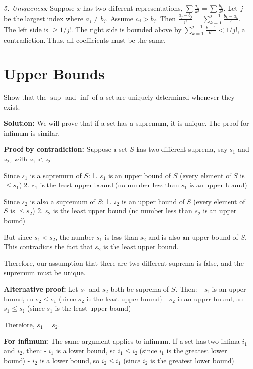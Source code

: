 \textit{5. Uniqueness:} Suppose $x$ has two different representations, $\sum \frac{a_k}{k!} = \sum \frac{b_k}{k!}$. Let $j$ be the largest index where $a_j \neq b_j$. Assume $a_j > b_j$. Then $\frac{a_j - b_j}{j!} = \sum_{k=1}^{j-1} \frac{b_k - a_k}{k!}$. The left side is $\ge 1/j!$. The right side is bounded above by $\sum_{k=1}^{j-1} \frac{k-1}{k!} < 1/j!$, a contradiction. Thus, all coefficients must be the same.


\section{Upper Bounds}

\begin{problembox}
Show that the $\sup$ and $\inf$ of a set are uniquely determined whenever they exist.
\end{problembox}

\textbf{Solution:}
We will prove that if a set has a supremum, it is unique. The proof for infimum is similar.

\textbf{Proof by contradiction:}
Suppose a set $S$ has two different suprema, say $s_1$ and $s_2$, with $s_1 < s_2$.

Since $s_1$ is a supremum of $S$:
1. $s_1$ is an upper bound of $S$ (every element of $S$ is $\leq s_1$)
2. $s_1$ is the least upper bound (no number less than $s_1$ is an upper bound)

Since $s_2$ is also a supremum of $S$:
1. $s_2$ is an upper bound of $S$ (every element of $S$ is $\leq s_2$)
2. $s_2$ is the least upper bound (no number less than $s_2$ is an upper bound)

But since $s_1 < s_2$, the number $s_1$ is less than $s_2$ and is also an upper bound of $S$. This contradicts the fact that $s_2$ is the least upper bound.

Therefore, our assumption that there are two different suprema is false, and the supremum must be unique.

\textbf{Alternative proof:}
Let $s_1$ and $s_2$ both be suprema of $S$. Then:
- $s_1$ is an upper bound, so $s_2 \leq s_1$ (since $s_2$ is the least upper bound)
- $s_2$ is an upper bound, so $s_1 \leq s_2$ (since $s_1$ is the least upper bound)

Therefore, $s_1 = s_2$.

\textbf{For infimum:}
The same argument applies to infimum. If a set has two infima $i_1$ and $i_2$, then:
- $i_1$ is a lower bound, so $i_1 \leq i_2$ (since $i_1$ is the greatest lower bound)
- $i_2$ is a lower bound, so $i_2 \leq i_1$ (since $i_2$ is the greatest lower bound)

